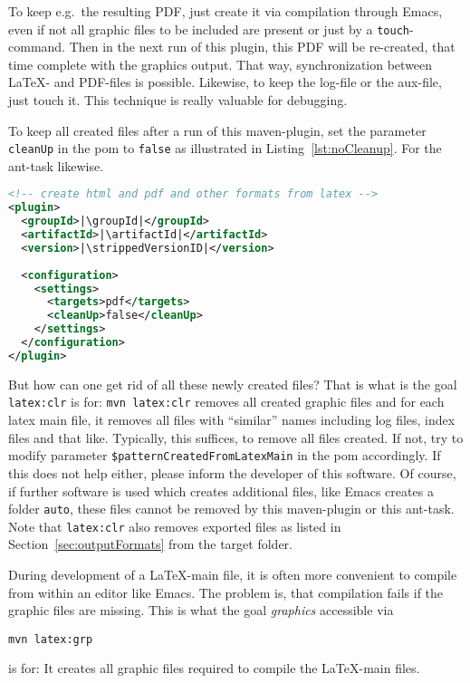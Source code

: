 To keep e.g.~the resulting PDF, 
just create it via compilation through Emacs, 
even if not all graphic files to be included are present 
or just by a \texttt{touch}-command. 
Then in the next run of this plugin, 
this PDF will be re-created, 
that time complete with the graphics output. 
That way, synchronization between \LaTeX- and PDF-files is possible. 
Likewise, to keep the log-file or the aux-file, just touch it. 
This technique is really valuable for debugging. 

To keep all created files after a run of this maven-plugin, 
set the parameter \texttt{cleanUp} in the pom 
to \texttt{false} as illustrated in Listing~\ref{lst:noCleanup}. 
For the ant-task likewise. 

\begin{lstlisting}[language=xml, basicstyle=\small,
escapechar=|,
float=b, captionpos=b, label={lst:noCleanup},
caption={Configuration without cleanup}]
<!-- create html and pdf and other formats from latex -->
<plugin>
  <groupId>|\groupId|</groupId>
  <artifactId>|\artifactId|</artifactId>
  <version>|\strippedVersionID|</version>
	
  <configuration>
    <settings>
      <targets>pdf</targets>
      <cleanUp>false</cleanUp>
    </settings>
  </configuration>
</plugin>
\end{lstlisting}


But how can one get rid of all these newly created files? 
That is what is the goal \texttt{latex:clr} is for: 
% 
\texttt{mvn latex:clr}
%
removes all created graphic files 
and for each latex main file, it removes all files with ``similar'' names
including log files, index files and that like.
Typically, this suffices, to remove all files created. 
If not, 
try to modify parameter \texttt{\$patternCreatedFromLatexMain} 
in the pom accordingly. 
If this does not help either, please inform the developer of this software. 
Of course, if further software is used which creates additional files, 
like Emacs creates a folder \texttt{auto}, 
these files cannot be removed by this maven-plugin or this ant-task.
Note that \texttt{latex:clr}
also removes exported files as listed in Section~\ref{sec:outputFormats}
from the target folder. 

During development of a \LaTeX-main file, 
it is often more convenient to compile from within an editor like Emacs. 
The problem is, that compilation fails if the graphic files are missing. 
This is what the goal \emph{graphics} accessible via 
% 
\begin{Verbatim}
mvn latex:grp
\end{Verbatim}
%
is for: 
It creates all graphic files required to compile the \LaTeX-main files. 

